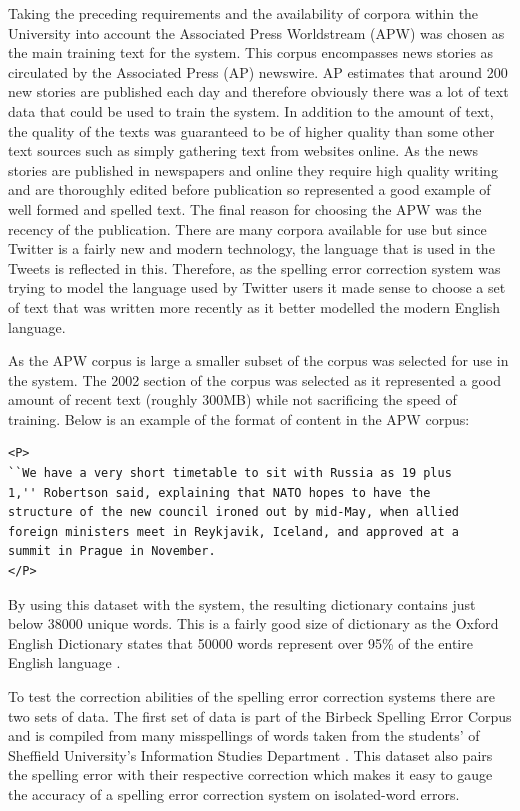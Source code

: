 Taking the preceding requirements and the availability of corpora within the University into account the Associated Press Worldstream (APW) \cite{} was chosen as the main training text for the system. This corpus encompasses news stories as circulated by the Associated Press (AP) newswire. AP estimates that around 200 new stories are published each day \cite{} and therefore obviously there was a lot of text data that could be used to train the system. In addition to the amount of text, the quality of the texts was guaranteed to be of higher quality than some other text sources such as simply gathering text from websites online. As the news stories are published in newspapers and online they require high quality writing and are thoroughly edited before publication so represented a good example of well formed and spelled text. The final reason for choosing the APW was the recency of the publication. There are many corpora available for use but since Twitter is a fairly new and modern technology, the language that is used in the Tweets is reflected in this. Therefore, as the spelling error correction system was trying to model the language used by Twitter users it made sense to choose a set of text that was written more recently as it better modelled the modern English language.

As the APW corpus is large a smaller subset of the corpus was selected for use in the system. The 2002 section of the corpus was selected as it represented a good amount of recent text (roughly 300MB) while not sacrificing the speed of training. Below is an example of the format of content in the APW corpus:

\begin{verbatim}
<P>
``We have a very short timetable to sit with Russia as 19 plus
1,'' Robertson said, explaining that NATO hopes to have the
structure of the new council ironed out by mid-May, when allied
foreign ministers meet in Reykjavik, Iceland, and approved at a
summit in Prague in November.
</P>
\end{verbatim}

By using this dataset with the system, the resulting dictionary contains just below 38000 unique words. This is a fairly good size of dictionary as the Oxford English Dictionary states that 50000 words represent over 95\% of the entire English language \cite{}.

To test the correction abilities of the spelling error correction systems there are two sets of data. The first set of data is part of the Birbeck Spelling Error Corpus \cite{} and is compiled from many misspellings of words taken from the students' of Sheffield University's Information Studies Department \cite{}. This dataset also pairs the spelling error with their respective correction which makes it easy to gauge the accuracy of a spelling error correction system on isolated-word errors.

